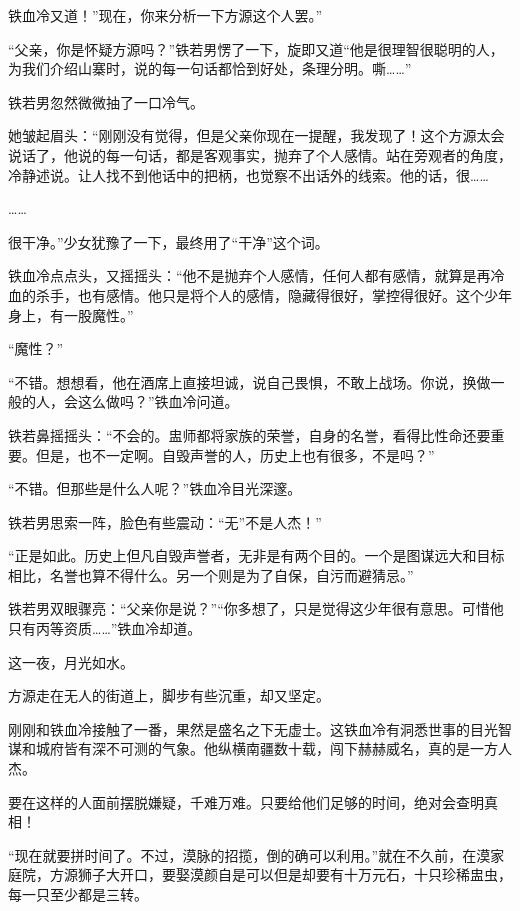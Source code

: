 
\begin{this_body}

铁血冷又道！”现在，你来分析一下方源这个人罢。”

“父亲，你是怀疑方源吗？”铁若男愣了一下，旋即又道“他是很理智很聪明的人，为我们介绍山寨时，说的每一句话都恰到好处，条理分明。嘶……”

铁若男忽然微微抽了一口冷气。

她皱起眉头：“刚刚没有觉得，但是父亲你现在一提醒，我发现了！这个方源太会说话了，他说的每一句话，都是客观事实，抛弃了个人感情。站在旁观者的角度，冷静述说。让人找不到他话中的把柄，也觉察不出话外的线索。他的话，很……

……

很干净。”少女犹豫了一下，最终用了“干净”这个词。

铁血冷点点头，又摇摇头：“他不是抛弃个人感情，任何人都有感情，就算是再冷血的杀手，也有感情。他只是将个人的感情，隐藏得很好，掌控得很好。这个少年身上，有一股魔性。”

“魔性？”

“不错。想想看，他在酒席上直接坦诚，说自己畏惧，不敢上战场。你说，换做一般的人，会这么做吗？”铁血冷问道。

铁若鼻摇摇头：“不会的。盅师都将家族的荣誉，自身的名誉，看得比性命还要重要。但是，也不一定啊。自毁声誉的人，历史上也有很多，不是吗？”

“不错。但那些是什么人呢？”铁血冷目光深邃。

铁若男思索一阵，脸色有些震动：“无”不是人杰！”

“正是如此。历史上但凡自毁声誉者，无非是有两个目的。一个是图谋远大和目标相比，名誉也算不得什么。另一个则是为了自保，自污而避猜忌。”

铁若男双眼骤亮：“父亲你是说？”“你多想了，只是觉得这少年很有意思。可惜他只有丙等资质……”铁血冷却道。

这一夜，月光如水。

方源走在无人的街道上，脚步有些沉重，却又坚定。

刚刚和铁血冷接触了一番，果然是盛名之下无虚士。这铁血冷有洞悉世事的目光智谋和城府皆有深不可测的气象。他纵横南疆数十载，闯下赫赫威名，真的是一方人杰。

要在这样的人面前摆脱嫌疑，千难万难。只要给他们足够的时间，绝对会查明真相！

“现在就要拼时间了。不过，漠脉的招揽，倒的确可以利用。”就在不久前，在漠家庭院，方源狮子大开口，要娶漠颜自是可以但是却要有十万元石，十只珍稀盅虫，每一只至少都是三转。


\end{this_body}
